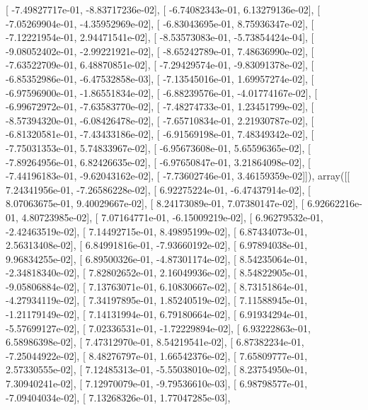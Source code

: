 \documentclass{article}
\begin{document}
       [ -7.49827717e-01,  -8.83717236e-02],
       [ -6.74082343e-01,   6.13279136e-02],
       [ -7.05269904e-01,  -4.35952969e-02],
       [ -6.83043695e-01,   8.75936347e-02],
       [ -7.12221954e-01,   2.94471541e-02],
       [ -8.53573083e-01,  -5.73854424e-04],
       [ -9.08052402e-01,  -2.99221921e-02],
       [ -8.65242789e-01,   7.48636990e-02],
       [ -7.63522709e-01,   6.48870851e-02],
       [ -7.29429574e-01,  -9.83091378e-02],
       [ -6.85352986e-01,  -6.47532858e-03],
       [ -7.13545016e-01,   1.69957274e-02],
       [ -6.97596900e-01,  -1.86551834e-02],
       [ -6.88239576e-01,  -4.01774167e-02],
       [ -6.99672972e-01,  -7.63583770e-02],
       [ -7.48274733e-01,   1.23451799e-02],
       [ -8.57394320e-01,  -6.08426478e-02],
       [ -7.65710834e-01,   2.21930787e-02],
       [ -6.81320581e-01,  -7.43433186e-02],
       [ -6.91569198e-01,   7.48349342e-02],
       [ -7.75031353e-01,   5.74833967e-02],
       [ -6.95673608e-01,   5.65596365e-02],
       [ -7.89264956e-01,   6.82426635e-02],
       [ -6.97650847e-01,   3.21864098e-02],
       [ -7.44196183e-01,  -9.62043162e-02],
       [ -7.73602746e-01,   3.46159359e-02]]), array([[  7.24341956e-01,  -7.26586228e-02],
       [  6.92275224e-01,  -6.47437914e-02],
       [  8.07063675e-01,   9.40029667e-02],
       [  8.24173089e-01,   7.07380147e-02],
       [  6.92662216e-01,   4.80723985e-02],
       [  7.07164771e-01,  -6.15009219e-02],
       [  6.96279532e-01,  -2.42463519e-02],
       [  7.14492715e-01,   8.49895199e-02],
       [  6.87434073e-01,   2.56313408e-02],
       [  6.84991816e-01,  -7.93660192e-02],
       [  6.97894038e-01,   9.96834255e-02],
       [  6.89500326e-01,  -4.87301174e-02],
       [  8.54235064e-01,  -2.34818340e-02],
       [  7.82802652e-01,   2.16049936e-02],
       [  8.54822905e-01,  -9.05806884e-02],
       [  7.13763071e-01,   6.10830667e-02],
       [  8.73151864e-01,  -4.27934119e-02],
       [  7.34197895e-01,   1.85240519e-02],
       [  7.11588945e-01,  -1.21179149e-02],
       [  7.14131994e-01,   6.79180664e-02],
       [  6.91934294e-01,  -5.57699127e-02],
       [  7.02336531e-01,  -1.72229894e-02],
       [  6.93222863e-01,   6.58986398e-02],
       [  7.47312970e-01,   8.54219541e-02],
       [  6.87382234e-01,  -7.25044922e-02],
       [  8.48276797e-01,   1.66542376e-02],
       [  7.65809777e-01,   2.57330555e-02],
       [  7.12485313e-01,  -5.55038010e-02],
       [  8.23754950e-01,   7.30940241e-02],
       [  7.12970079e-01,  -9.79536610e-03],
       [  6.98798577e-01,  -7.09404034e-02],
       [  7.13268326e-01,   1.77047285e-03],
\end{document}
